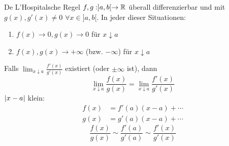\begin{Sat}{De L'Hospitalsche Regel}
  $f,g:]a,b[\to\mathbb{R}$ überall differenzierbar und mit $g(x), g'(x)\neq 0$ $\forall x\in ]a,b[$. In jeder dieser Situationen:
  \begin{enumerate}
    \item $f(x)\to 0, g(x)\to 0$ für $x\downarrow a$
    \item $f(x), g(x) \to +\infty$ (bzw. $-\infty$) für $x\downarrow a$
  \end{enumerate}
  Falls $\lim_{x\downarrow a}\frac{f'(x)}{g'(x)}$ existiert (oder $\pm \infty$ ist), dann
  \[\lim_{x\downarrow a}\frac{f(x)}{g(x)}=\lim_{x\downarrow a}\frac{f'(x)}{g'(x)}\]
  $\mathopen| x-a \mathclose|$ klein:
  \begin{eqnarray*}
    f(x)&=f'(a)(x-a)+\cdots\\
    g(x)&=g'(a)(x-a)+\cdots
  \end{eqnarray*}
  \[\frac{f(x)}{g(x)}\sim\frac{f'(a)}{g'(a)}\sim\frac{f'(x)}{g'(x)}\]
\end{Sat}
